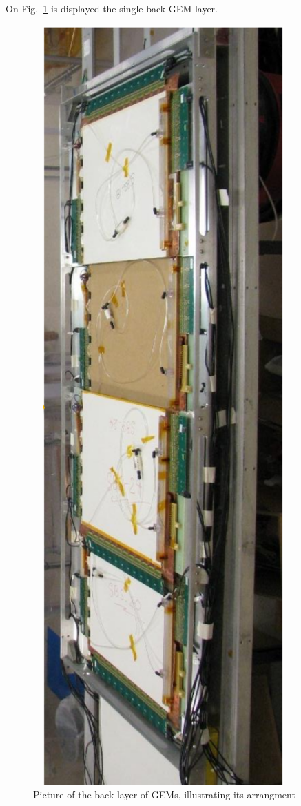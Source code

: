 \iffalse
On Fig.~\ref{fig:uva_gem} is displayed the single back GEM layer.
%
\begin{figure}[!h]
  \begin{center}
    \includegraphics[angle=-90,width=10cm]{Plots/UVaGEMs.png}
    \caption{Picture of the back layer of GEMs, illustrating its arrangment}
    \label{fig:uva_gem}
  \end{center}
\end{figure}
%

